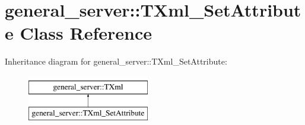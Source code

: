 \hypertarget{classgeneral__server_1_1TXml__SetAttribute}{\section{general\-\_\-server\-:\-:\-T\-Xml\-\_\-\-Set\-Attribute \-Class \-Reference}
\label{classgeneral__server_1_1TXml__SetAttribute}
}
\-Inheritance diagram for general\-\_\-server\-:\-:\-T\-Xml\-\_\-\-Set\-Attribute\-:\begin{figure}[H]
\begin{center}
\leavevmode
\includegraphics[height=2.000000cm]{classgeneral__server_1_1TXml__SetAttribute}
\end{center}
\end{figure}
